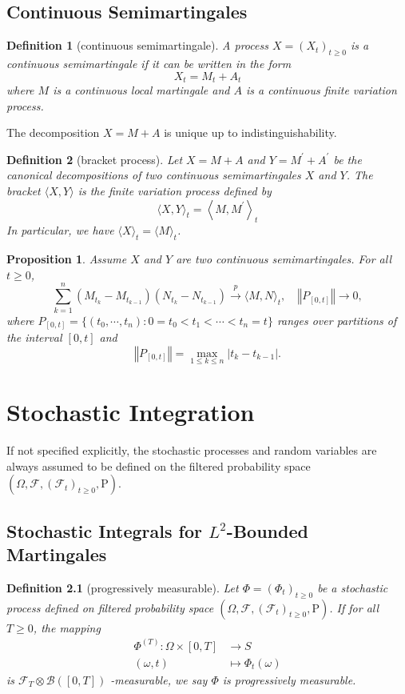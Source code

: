 \documentclass{report}
\newtheorem{definition}{Definition}[section]
\newtheorem{proposition}{Proposition}[section]
\theoremstyle{nonumberplain}
\begin{document}
\section{Continuous Semimartingales}
\begin{definition}[continuous semimartingale]
A process $X=\left(X_{t}\right)_{t \geq 0}$ is a continuous semimartingale if it can be written in the form
\[
X_{t}=M_{t}+A_{t}
\]
where $M$ is a continuous local martingale and $A$ is a continuous finite variation process.
\end{definition}
The decomposition $X=M+A$ is unique up to indistinguishability.

\begin{definition}[bracket process]
Let $X=M+A$ and $Y=M^{\prime}+A^{\prime}$ be the canonical decompositions of two continuous semimartingales $X$ and $Y$. The bracket $\langle X, Y\rangle$ is the finite variation process defined by
\[
\langle X, Y\rangle_{t}=\left\langle M, M^{\prime}\right\rangle_{t}
\]
In particular, we have $\langle X\rangle_{t}=\langle M\rangle_{t}$.
\end{definition}

\begin{proposition}
	Assume $X$ and $Y$ are two continuous semimartingales. For all $t\ge0$,
	\[
	\sum_{k=1}^{n}\left(M_{t_{k}}-M_{t_{k-1}}\right)\left(N_{t_{k}}-N_{t_{k-1}}\right)\stackrel{p}{\longrightarrow}\langle M, N\rangle_{t},\quad\left\Vert P_{[0,t]}\right\Vert \longrightarrow 0,
	\]
	where $P_{[0,t]}=\{(t_0,\cdots,t_n):0=t_0<t_1<\cdots<t_n=t\}$ ranges over partitions of the interval $[0,t]$ and 
	\[
	\left\Vert P_{[0,t]}\right\Vert=\max\limits_{1\le k\le n}{|t_k-t_{k-1}|}.
	\]
\end{proposition}

\chapter{Stochastic Integration}
If not specified explicitly, the stochastic processes and random variables are always assumed to be defined on the filtered probability space $(\Omega,\mathcal{F},(\mathcal{F}_{t})_{t\ge0},\mathrm{P})$.
\section{Stochastic Integrals for $L^2$-Bounded Martingales}
\begin{definition}[progressively measurable]
	Let $\Phi=(\Phi_t)_{t\ge0}$ be a stochastic process defined on filtered probability space $(\Omega,\mathcal{F},(\mathcal{F}_{t})_{t\ge0},\mathrm{P})$. If for all $T\ge0$, the mapping
	\begin{align*}
	\Phi^{(T)}: \Omega \times [0, T]&\longrightarrow S\\
	(\omega,t)&\longmapsto \Phi_t(\omega)
	\end{align*}
	is $\mathcal{F}_T\otimes \mathcal{B}([0,T])$ -measurable, we say $\Phi$ is \emph{progressively measurable}.
\end{definition}
\end{document}
